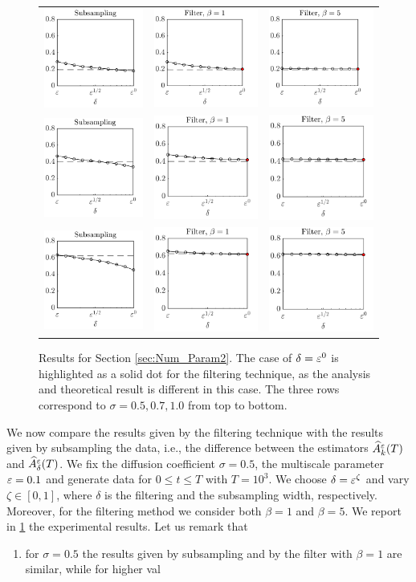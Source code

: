 \documentclass[review,onefignum,onetabnum]{siamonline190516}
\begin{document}
\begin{figure}[t]
	\centering
	\begin{tabular}{ccc}
		\includegraphics[]{Figures/OUSubs_s5} & \includegraphics[]{Figures/OUFilt_s5_b1}  & \includegraphics[]{Figures/OUFilt_s5_b5} \\ %
		\includegraphics[]{Figures/OUSubs_s7} & \includegraphics[]{Figures/OUFilt_s7_b1}  & \includegraphics[]{Figures/OUFilt_s7_b5} \\ %
		\includegraphics[]{Figures/OUSubs_s10} & \includegraphics[]{Figures/OUFilt_s10_b1}  & \includegraphics[]{Figures/OUFilt_s10_b5} %
	\end{tabular}
	\caption{Results for Section \ref{sec:Num_Param2}. The case of $\delta = \varepsilon^0$ is highlighted as a solid dot for the filtering technique, as the analysis and theoretical result is different in this case. The three rows correspond to $\sigma = 0.5, 0.7, 1.0$ from top to bottom.}
	\label{fig:OU}
\end{figure}

We now compare the results given by the filtering technique with the results given by subsampling the data, i.e., the difference between the estimators $\widehat A^\varepsilon_k(T)$ and $\widehat A^\varepsilon_\delta(T)$. We fix the diffusion coefficient $\sigma = 0.5$, the multiscale parameter $\varepsilon = 0.1$ and generate data for $0 \leq t \leq T$ with $T = 10^3$. We choose $\delta = \varepsilon^{\zeta}$ and vary $\zeta \in [0, 1]$, where $\delta$ is the filtering and the subsampling width, respectively. Moreover, for the filtering method we consider both $\beta = 1$ and $\beta = 5$. We report in \cref{fig:OU} the experimental results. Let us remark that
\begin{enumerate}
	\item for $\sigma = 0.5$ the results given by subsampling and by the filter with $\beta = 1$ are similar, while for higher val
\end{enumerate}
\end{document}
